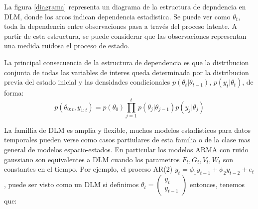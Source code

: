 \documentclass[12pt]{article}\usepackage[]{graphicx}\usepackage[]{color}
\begin{document}
\begin{center}
\label{diagrama}
\end{center}

La figura \ref{diagrama} representa un diagrama de la estructura de depndencia en DLM, donde los arcos indican dependencia estadistica. Se puede ver como  $\theta_t$, toda la dependencia entre observaciones pasa a través del proceso latente. A partir de esta estructura, se puede considerar que las observaciones representan una medida ruidosa el proceso de estado.

La principal consecuencia de la estructura de dependencia es que la distribucion conjunta de todas las variables de interes queda determinada por la distribucion previa del estado inicial y las densidades condicionales $p(\theta_t | \theta_{t-1})$, $p(y_t|\theta_t)$, de forma: 
\[
p(\theta_{0:t}, y_{1:t}) =  p(\theta_0) \prod_{j=1}^t  p(\theta_j | \theta_{j-1})  p(y_j|\theta_j)
\]

La famillia de DLM es amplia y flexible, muchos modelos estadisticos para datos temporales pueden verse como casos partiulares de esta familia o de la clase mas general de modelos espacio-estados. En particular los modelos ARMA con ruido gaussiano son equivalentes a DLM cuando los parametros $F_t, G_t, V_t, W_t$ son constantes en el tiempo. Por ejemplo, el proceso  AR(2) $y_t = \phi_1 y_{t-1} + \phi_2 y_{t-2} + e_t$, puede ser visto como un DLM si definimos $\theta_t = 
\begin{pmatrix}
y_t \\
y_{t-1}
\end{pmatrix}
$
entonces, tenemos que:  
\end{document}
